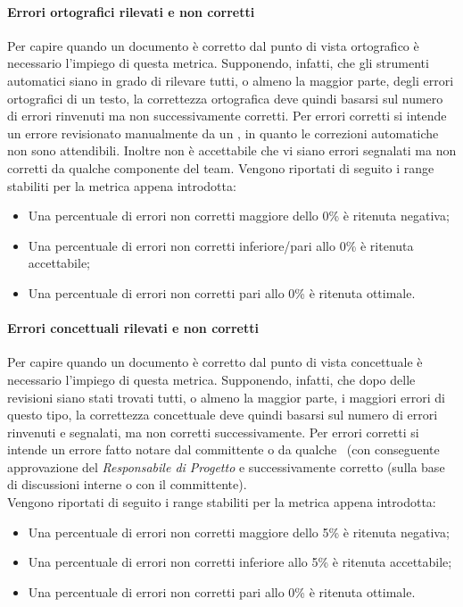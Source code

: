 \documentclass[../PianoDiQualifica.tex]{subfiles}
\begin{document}
			\paragraph{Errori ortografici rilevati e non corretti}
			Per capire quando un documento è corretto dal punto di vista ortografico è necessario l'impiego di questa metrica. Supponendo, infatti, che gli strumenti automatici siano in grado di rilevare tutti, o almeno la maggior parte, degli errori ortografici di un testo, la correttezza ortografica deve quindi basarsi sul numero di errori rinvenuti ma non successivamente corretti. Per errori corretti si intende un errore revisionato manualmente da un \verificatore, in quanto le correzioni automatiche non sono attendibili. Inoltre non è accettabile che vi siano errori segnalati ma non corretti da qualche componente del team. Vengono riportati di seguito i range stabiliti per la metrica appena introdotta:
			\begin{itemize}
				\item Una percentuale di errori non corretti maggiore dello 0\% è ritenuta negativa;
				\item Una percentuale di errori non corretti inferiore/pari allo 0\% è ritenuta accettabile;
				\item Una percentuale di errori non corretti pari allo 0\% è ritenuta ottimale.
			\end{itemize}

			\paragraph{Errori concettuali rilevati e non corretti}
			Per capire quando un documento è corretto dal punto di vista concettuale è necessario l'impiego di questa metrica. Supponendo, infatti, che dopo delle revisioni siano stati trovati tutti, o almeno la maggior parte, i maggiori errori di questo tipo, la correttezza concettuale deve quindi basarsi sul numero di errori rinvenuti e segnalati, ma non corretti successivamente. Per errori corretti si intende un errore fatto notare dal committente o da qualche \verificatore\ (con conseguente approvazione del \textit{Responsabile di Progetto} e successivamente corretto (sulla base di discussioni interne o con il committente).\\
			Vengono riportati di seguito i range stabiliti per la metrica appena introdotta:
			\begin{itemize}
				\item Una percentuale di errori non corretti maggiore dello 5\% è ritenuta negativa;
				\item Una percentuale di errori non corretti inferiore allo 5\% è ritenuta accettabile;
				\item Una percentuale di errori non corretti pari allo 0\% è ritenuta ottimale.
			\end{itemize}
\end{document}
